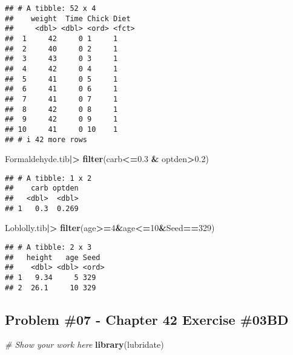 \documentclass[
]{article}
\newenvironment{Shaded}{\begin{snugshade}}{\end{snugshade}}
\newcommand{\CommentTok}[1]{\textcolor[rgb]{0.56,0.35,0.01}{\textit{#1}}}
\newcommand{\DecValTok}[1]{\textcolor[rgb]{0.00,0.00,0.81}{#1}}
\newcommand{\FloatTok}[1]{\textcolor[rgb]{0.00,0.00,0.81}{#1}}
\newcommand{\FunctionTok}[1]{\textcolor[rgb]{0.13,0.29,0.53}{\textbf{#1}}}
\newcommand{\NormalTok}[1]{#1}
\newcommand{\SpecialCharTok}[1]{\textcolor[rgb]{0.81,0.36,0.00}{\textbf{#1}}}
\begin{document}
\begin{verbatim}
## # A tibble: 52 x 4
##    weight  Time Chick Diet 
##     <dbl> <dbl> <ord> <fct>
##  1     42     0 1     1    
##  2     40     0 2     1    
##  3     43     0 3     1    
##  4     42     0 4     1    
##  5     41     0 5     1    
##  6     41     0 6     1    
##  7     41     0 7     1    
##  8     42     0 8     1    
##  9     42     0 9     1    
## 10     41     0 10    1    
## # i 42 more rows
\end{verbatim}

\begin{Shaded}
\begin{Highlighting}[]
\NormalTok{Formaldehyde.tib}\SpecialCharTok{|\textgreater{}}
  \FunctionTok{filter}\NormalTok{(carb}\SpecialCharTok{\textless{}=}\FloatTok{0.3} \SpecialCharTok{\&}\NormalTok{ optden}\SpecialCharTok{\textgreater{}}\FloatTok{0.2}\NormalTok{)}
\end{Highlighting}
\end{Shaded}

\begin{verbatim}
## # A tibble: 1 x 2
##    carb optden
##   <dbl>  <dbl>
## 1   0.3  0.269
\end{verbatim}

\begin{Shaded}
\begin{Highlighting}[]
\NormalTok{Loblolly.tib}\SpecialCharTok{|\textgreater{}}
  \FunctionTok{filter}\NormalTok{(age}\SpecialCharTok{\textgreater{}=}\DecValTok{4}\SpecialCharTok{\&}\NormalTok{age}\SpecialCharTok{\textless{}=}\DecValTok{10}\SpecialCharTok{\&}\NormalTok{Seed}\SpecialCharTok{==}\DecValTok{329}\NormalTok{)}
\end{Highlighting}
\end{Shaded}

\begin{verbatim}
## # A tibble: 2 x 3
##   height   age Seed 
##    <dbl> <dbl> <ord>
## 1   9.34     5 329  
## 2  26.1     10 329
\end{verbatim}

\newpage

\hypertarget{problem-07---chapter-42-exercise-03bd}{%
\subsection{Problem \#07 - Chapter 42 Exercise
\#03BD}\label{problem-07---chapter-42-exercise-03bd}}

\begin{Shaded}
\begin{Highlighting}[]
\CommentTok{\# Show your work here}
\FunctionTok{library}\NormalTok{(lubridate)}
\end{Highlighting}
\end{Shaded}
\end{document}

